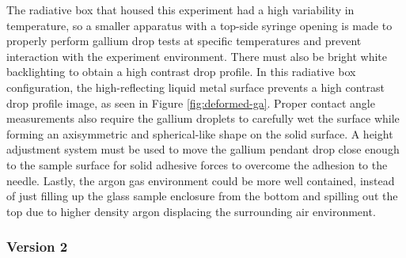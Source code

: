 The radiative box that housed this experiment had a high variability in temperature, so a smaller apparatus with a top-side syringe opening is made to properly perform gallium drop tests at specific temperatures and prevent interaction with the experiment environment. There must also be bright white backlighting to obtain a high contrast drop profile. In this radiative box configuration, the high-reflecting liquid metal surface prevents a high contrast drop profile image, as seen in Figure \ref{fig:deformed-ga}. Proper contact angle measurements also require the gallium droplets to carefully wet the surface while forming an axisymmetric and spherical-like shape on the solid surface. A height adjustment system must be used to move the gallium pendant drop close enough to the sample surface for solid adhesive forces to overcome the adhesion to the needle. Lastly, the argon gas environment could be more well contained, instead of just filling up the glass sample enclosure from the bottom and spilling out the top due to higher density argon displacing the surrounding air environment. 

\subsubsection{Version 2}

